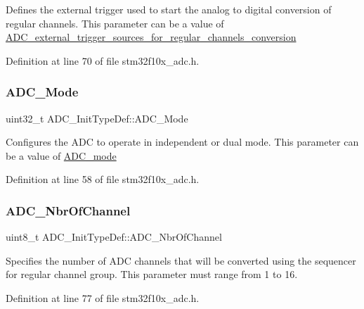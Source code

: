 Defines the external trigger used to start the analog to digital conversion of regular channels. This parameter can be a value of \hyperlink{group___a_d_c__external__trigger__sources__for__regular__channels__conversion}{A\+D\+C\+\_\+external\+\_\+trigger\+\_\+sources\+\_\+for\+\_\+regular\+\_\+channels\+\_\+conversion} 

Definition at line 70 of file stm32f10x\+\_\+adc.\+h.

\mbox{\label{struct_a_d_c___init_type_def_a0f9ec17ad585d66a54625213062c9260}} 
\subsubsection{\texorpdfstring{A\+D\+C\+\_\+\+Mode}{ADC\_Mode}}
{\footnotesize\ttfamily uint32\+\_\+t A\+D\+C\+\_\+\+Init\+Type\+Def\+::\+A\+D\+C\+\_\+\+Mode}

Configures the A\+DC to operate in independent or dual mode. This parameter can be a value of \hyperlink{group___a_d_c__mode}{A\+D\+C\+\_\+mode} 

Definition at line 58 of file stm32f10x\+\_\+adc.\+h.

\mbox{\label{struct_a_d_c___init_type_def_ad6f39a12ac32a2767085ac94e9338bc3}} 
\subsubsection{\texorpdfstring{A\+D\+C\+\_\+\+Nbr\+Of\+Channel}{ADC\_NbrOfChannel}}
{\footnotesize\ttfamily uint8\+\_\+t A\+D\+C\+\_\+\+Init\+Type\+Def\+::\+A\+D\+C\+\_\+\+Nbr\+Of\+Channel}

Specifies the number of A\+DC channels that will be converted using the sequencer for regular channel group. This parameter must range from 1 to 16. 

Definition at line 77 of file stm32f10x\+\_\+adc.\+h.

\mbox{\label{struct_a_d_c___init_type_def_aaf44f54f22ab40bf8fae01f075aa4c87}} 
